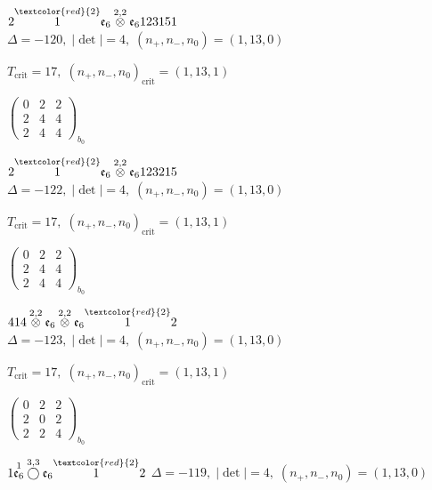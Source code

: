 \documentclass[10pt]{article}
\begin{document}
$2\overset{\textcolor{red}{2}}{1}\mathfrak{e}_6\overset{2,2}{\otimes}\mathfrak{e}_6123151$ \quad $\Delta=-120,\; |\det|=4,\; (n_+,n_-,n_0)=(1,13,0)$

\hspace{1em}$T_{\text{crit}}=17,\; (n_+,n_-,n_0)_{\text{crit}}=(1,13,1)$

\hspace{2em}$\left(\begin{smallmatrix}0 & 2 & 2 \\ 2 & 4 & 4 \\ 2 & 4 & 4\end{smallmatrix}\right)_{\!b_0}$

\smallskip

$2\overset{\textcolor{red}{2}}{1}\mathfrak{e}_6\overset{2,2}{\otimes}\mathfrak{e}_6123215$ \quad $\Delta=-122,\; |\det|=4,\; (n_+,n_-,n_0)=(1,13,0)$

\hspace{1em}$T_{\text{crit}}=17,\; (n_+,n_-,n_0)_{\text{crit}}=(1,13,1)$

\hspace{2em}$\left(\begin{smallmatrix}0 & 2 & 2 \\ 2 & 4 & 4 \\ 2 & 4 & 4\end{smallmatrix}\right)_{\!b_0}$

\smallskip

$414\overset{2,2}{\otimes}\mathfrak{e}_6\overset{2,2}{\otimes}\mathfrak{e}_6\overset{\textcolor{red}{2}}{1}2$ \quad $\Delta=-123,\; |\det|=4,\; (n_+,n_-,n_0)=(1,13,0)$

\hspace{1em}$T_{\text{crit}}=17,\; (n_+,n_-,n_0)_{\text{crit}}=(1,13,1)$

\hspace{2em}$\left(\begin{smallmatrix}0 & 2 & 2 \\ 2 & 0 & 2 \\ 2 & 2 & 4\end{smallmatrix}\right)_{\!b_0}$

\smallskip

$1\overset{1}{\mathfrak{e}_6}\overset{3,3}{\bigcirc}\mathfrak{e}_6\overset{\textcolor{red}{2}}{1}2$ \quad $\Delta=-119,\; |\det|=4,\; (n_+,n_-,n_0)=(1,13,0)$
\end{document}
